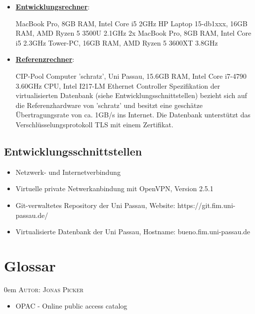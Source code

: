 \documentclass{article}
\makeatletter
\newcommand{\sectionauthor}[1]{
	{\parindent 0em \large \scshape Autor: #1 \par \nobreak \vspace*{2em}}
	\@afterheading
}
\makeatother
\begin{document}
\begin{itemize}
\item \underline{\textbf{Entwicklungsrechner}}: 
\begin{flushleft}
MacBook Pro, 8GB RAM, Intel Core i5 2GHz  \linebreak
HP Laptop 15-db1xxx, 16GB RAM, AMD Ryzen 5 3500U 2.1GHz \linebreak
2x MacBook Pro, 8GB RAM, Intel Core i5 2.3GHz \linebreak
Tower-PC, 16GB RAM, AMD Ryzen 5 3600XT 3.8GHz \linebreak
\end{flushleft}
\item \underline{\textbf{Referenzrechner}}:
\begin{flushleft}
CIP-Pool Computer 'schratz', Uni Passau, 15.6GB RAM, Intel Core i7-4790 3.60GHz CPU, Intel I217-LM Ethernet Controller \linebreak
Spezifikation der virtualisierten Datenbank (siehe Entwicklungsschnittstellen) bezieht sich auf die Referenzhardware von 'schratz' und besitzt eine geschätze Übertragungsrate von ca. 1GB/s ins Internet. Die Datenbank unterstützt das Verschlüsselungsprotokoll TLS mit einem Zertifikat. \linebreak
\end{flushleft}
\end{itemize}

\subsection{Entwicklungsschnittstellen}

\begin{itemize}
\item \begin{flushleft} Netzwerk- und Internetverbindung \end{flushleft} 
\item \begin{flushleft} Virtuelle private Netwerkanbindung mit OpenVPN, Version 2.5.1 \end{flushleft} 
\item \begin{flushleft} Git-verwaltetes Repository der Uni Passau, Website: https://git.fim.uni-passau.de/ \end{flushleft} 
\item \begin{flushleft} Virtualisierte Datenbank der Uni Passau, Hostname: bueno.fim.uni-passau.de \end{flushleft}
\end{itemize}

\newpage

\section{Glossar} %
\sectionauthor{Jonas Picker}
	\begin{itemize}
		\item OPAC - Online public access catalog
	\end{itemize}
\end{document}
